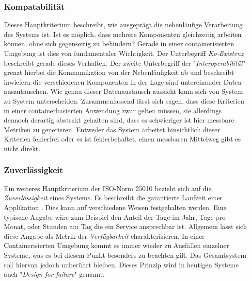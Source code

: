 \subsubsection{Kompatabilität}
Dieses Hauptkriterium beschreibt, wie ausgeprägt die nebenläufige Verarbeitung des Systems ist. Ist es möglich, dass mehrere Komponenten gleichzeitig arbeiten können, ohne sich gegenseitig zu behindern? Gerade in einer containerisierten Umgebung ist dies von fundamentaler Wichtigkeit. Der Unterbegriff \emph{Ko-Existenz} beschreibt gerade dieses Verhalten. Der zweite Unterbegriff der "\emph{Interoperabilität}" grenzt hierbei die Kommunikation von der Nebenläufigkeit ab und beschreibt inwiefern die verschiedenen Komponenten in der Lage sind untereinander Daten auszutauschen. Wie genau dieser Datenaustausch aussieht kann sich von System zu System unterscheiden. Zusammenfassend lässt sich sagen, dass diese Kriterien in einer containerbasierten Anwendung zwar gelten müssen, sie allerdings dennoch derartig abstrakt gehalten sind, dass es schwieriger ist hier messbare Metriken zu generieren. Entweder das System arbeitet hinsichtlich dieser Kriterien fehlerfrei oder es ist fehlerbehaftet, einen messbaren Mittelweg gibt es nicht direkt.


\subsubsection{Zuverlässigkeit}

Ein weiteres Hauptkriterium der ISO-Norm 25010 bezieht sich auf die \emph{Zuverlässigkeit} eines Systems. Es beschreibt die garantierte Laufzeit einer Applikation \cite{nfr-dotnetcurry}. Dies kann auf verschiedene Weisen festgehalten werden. Eine typische Angabe wäre zum Beispiel den Anteil der Tage im Jahr, Tage pro Monat, oder Stunden am Tag die ein Service ansprechbar ist. Allgemein lässt sich diese Angabe als Metrik der \emph{Verfügbarkeit} charakterisieren. In einer Containerisierten Umgebung kommt es immer wieder zu Ausfällen einzelner Systeme, was es bei diesem Punkt besonders zu beachten gilt. Das Gesamtsystem soll hiervon jedoch unberührt bleiben. Dieses Prinzip wird in heutigen Systeme auch "\emph{Design for failure}" genannt. 

